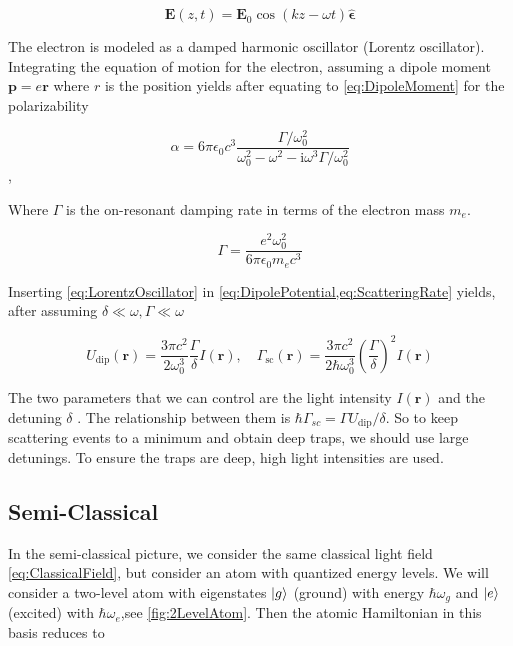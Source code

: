 \begin{equation}\label{eq:ClassicalField}
	\mathbf{E}(z,t) = \mathbf{E}_0 \cos{(k z - \omega t)} 	\bm{\hat{\epsilon}}
\end{equation}
	 
The electron is modeled as a damped harmonic oscillator (Lorentz oscillator). Integrating the equation of motion for the electron, assuming a dipole moment $\mathbf{p} = e \mathbf{r}$ where $r$ is the position yields after equating to \cref{eq:DipoleMoment} for the polarizability \cite{Grimm2000}

\begin{equation}\label{eq:LorentzOscillator}
	\alpha=6 \pi \epsilon_{0} c^{3} \frac{\Gamma / \omega_{0}^{2}}{\omega_{0}^{2}-\omega^{2}-\mathrm{i}\omega^3\Gamma/\omega_0^2}
\end{equation},

Where $\Gamma$ is the on-resonant damping rate in terms of the electron mass $m_e$. 

\begin{equation}\label{eq:ResonantDampingRate}
	\Gamma = \frac{e^2 \omega_0^2}{6\pi \epsilon_0 m_e c^3}
\end{equation}

Inserting \cref{eq:LorentzOscillator} in \cref{eq:DipolePotential,eq:ScatteringRate} yields, after assuming $\delta \ll \omega, \Gamma \ll \omega$

\begin{equation}\label{eq:DipoleClassicalResult} 
	U_{\text{dip}}(\mathbf{r}) = 
	\frac{3\pi c^2}{2\omega_0^3}\frac{\Gamma}{\delta} I(\mathbf{r}),
	\quad
	\Gamma_{\text{sc}}(\mathbf{r}) = 
	\frac{3\pi c^2}{2\hbar\omega_0^3}\left(\frac{\Gamma}{\delta}\right)^2 I(\mathbf{r})
\end{equation}

The two parameters that we can control are the light intensity $I(\mathbf{r})$ and the detuning $\delta$ \cite{Grimm2000}. The relationship between them is $\hbar \Gamma_{sc} =\Gamma U_{\text{dip}}/\delta$. So to keep scattering events to a minimum and obtain deep traps, we should use large detunings. To ensure the traps are deep, high light intensities are used. 

\subsection{Semi-Classical}

In the semi-classical picture, we consider the same classical light field \cref{eq:ClassicalField}, but consider an atom with quantized energy levels. We will consider a two-level atom with eigenstates $\lvert g\rangle$ (ground) with energy $\hbar \omega_g$ and $\lvert e\rangle$ (excited) with $\hbar \omega_e$,see \cref{fig:2LevelAtom}. Then the atomic Hamiltonian in this basis reduces to \cite{Loudon2000}

